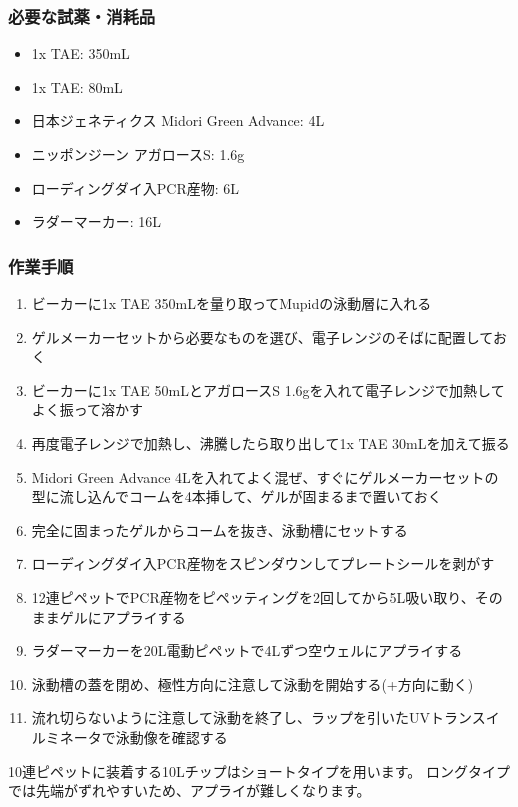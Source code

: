 \documentclass[titlepage,10pt,a4paper]{jsbook}
\begin{document}
\subsubsection{必要な試薬・消耗品}
\begin{itemize}
\item 1x TAE: 350mL
\item 1x TAE: 80mL
\item 日本ジェネティクス Midori Green Advance: 4{\textmu}L
\item ニッポンジーン アガロースS: 1.6g
\item ローディングダイ入PCR産物: 6{\textmu}L
\item ラダーマーカー: 16{\textmu}L
\end{itemize}

\subsubsection{作業手順}
\begin{enumerate}
\item ビーカーに1x TAE 350mLを量り取ってMupidの泳動層に入れる
\item ゲルメーカーセットから必要なものを選び、電子レンジのそばに配置しておく
\item ビーカーに1x TAE 50mLとアガロースS 1.6gを入れて電子レンジで加熱してよく振って溶かす
\item 再度電子レンジで加熱し、沸騰したら取り出して1x TAE 30mLを加えて振る
\item Midori Green Advance 4{\textmu}Lを入れてよく混ぜ、すぐにゲルメーカーセットの型に流し込んでコームを4本挿して、ゲルが固まるまで置いておく
\item 完全に固まったゲルからコームを抜き、泳動槽にセットする
\item ローディングダイ入PCR産物をスピンダウンしてプレートシールを剥がす
\item 12連ピペットでPCR産物をピペッティングを2回してから5{\textmu}L吸い取り、そのままゲルにアプライする
\item ラダーマーカーを20{\textmu}L電動ピペットで4{\textmu}Lずつ空ウェルにアプライする
\item 泳動槽の蓋を閉め、極性方向に注意して泳動を開始する(+方向に動く)
\item 流れ切らないように注意して泳動を終了し、ラップを引いたUVトランスイルミネータで泳動像を確認する
\end{enumerate}

10連ピペットに装着する10{\textmu}Lチップはショートタイプを用います。
ロングタイプでは先端がずれやすいため、アプライが難しくなります。
\end{document}
